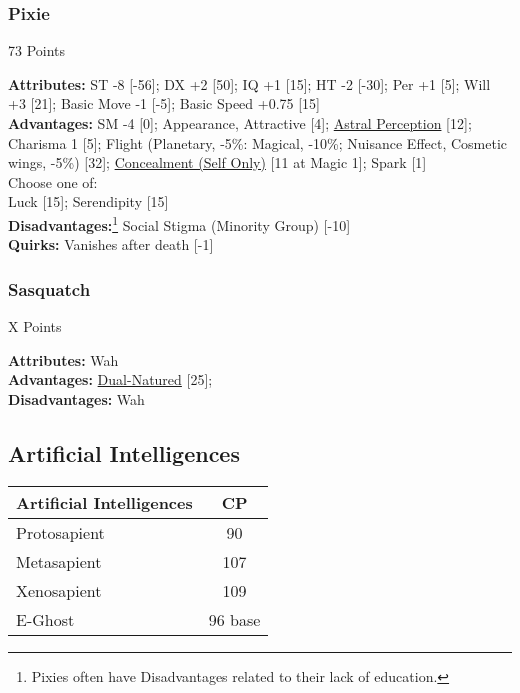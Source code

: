 \begin{multicols*}{3}
	\subsubsection*{Pixie}
	\begin{flushright}
		73 Points
	\end{flushright}
	\textbf{Attributes:} 
	ST -8 [-56]; DX +2 [50]; IQ +1 [15]; HT -2 [-30]; Per +1 [5]; Will +3 [21]; Basic Move -1 [-5]; Basic Speed +0.75 [15]
	\\\textbf{Advantages:} 
	SM -4 [0]; Appearance, Attractive [4]; \hyperref[astral_perception]{Astral Perception} [12]; Charisma 1 [5]; Flight (Planetary, -5\%: Magical, -10\%; Nuisance Effect,  Cosmetic wings, -5\%) [32]; \hyperref[concealment_self_only]{Concealment (Self Only)} [11 at Magic 1]; Spark [1]
	\\ Choose one of: \\
	Luck [15]; Serendipity [15]
	\\\textbf{Disadvantages:}\footnote{Pixies often have Disadvantages related to their lack of education.}
	Social Stigma (Minority Group) [-10]
	\\\textbf{Quirks:}
	Vanishes after death [-1]
	
	\subsubsection*{Sasquatch}
	\begin{flushright}
		X Points
	\end{flushright}
	\textbf{Attributes:} 
	Wah
	\\\textbf{Advantages:} 
	\hyperref[dual_natured]{Dual-Natured} [25]; 
	\\\textbf{Disadvantages:} 
	Wah
	
	\subsection{Artificial Intelligences}
	
	\begin{center}
		\begin{tabularx}{0.32\textwidth}{|X|c|}
			\hline
			Artificial Intelligences & CP \\
			\hline
			\hline
			Protosapient & 90\\
			Metasapient & 107\\
			Xenosapient & 109 \\
			E-Ghost & 96 base\\
			\hline
		\end{tabularx}
	\end{center}
	

\end{multicols*}
